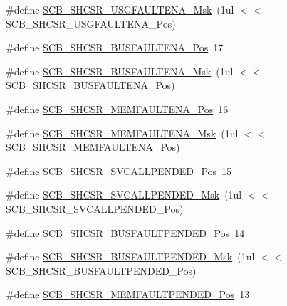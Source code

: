 \begin{DoxyCompactItemize}
\item 
\#define \hyperlink{group__CMSIS__CM3__SCB_ga056fb6be590857bbc029bed48b21dd79}{S\+C\+B\+\_\+\+S\+H\+C\+S\+R\+\_\+\+U\+S\+G\+F\+A\+U\+L\+T\+E\+N\+A\+\_\+\+Msk}~(1ul $<$$<$ S\+C\+B\+\_\+\+S\+H\+C\+S\+R\+\_\+\+U\+S\+G\+F\+A\+U\+L\+T\+E\+N\+A\+\_\+\+Pos)
\item 
\#define \hyperlink{group__CMSIS__CM3__SCB_ga3d32edbe4a5c0335f808cfc19ec7e844}{S\+C\+B\+\_\+\+S\+H\+C\+S\+R\+\_\+\+B\+U\+S\+F\+A\+U\+L\+T\+E\+N\+A\+\_\+\+Pos}~17
\item 
\#define \hyperlink{group__CMSIS__CM3__SCB_ga43e8cbe619c9980e0d1aacc85d9b9e47}{S\+C\+B\+\_\+\+S\+H\+C\+S\+R\+\_\+\+B\+U\+S\+F\+A\+U\+L\+T\+E\+N\+A\+\_\+\+Msk}~(1ul $<$$<$ S\+C\+B\+\_\+\+S\+H\+C\+S\+R\+\_\+\+B\+U\+S\+F\+A\+U\+L\+T\+E\+N\+A\+\_\+\+Pos)
\item 
\#define \hyperlink{group__CMSIS__CM3__SCB_ga685b4564a8760b4506f14ec4307b7251}{S\+C\+B\+\_\+\+S\+H\+C\+S\+R\+\_\+\+M\+E\+M\+F\+A\+U\+L\+T\+E\+N\+A\+\_\+\+Pos}~16
\item 
\#define \hyperlink{group__CMSIS__CM3__SCB_gaf084424fa1f69bea36a1c44899d83d17}{S\+C\+B\+\_\+\+S\+H\+C\+S\+R\+\_\+\+M\+E\+M\+F\+A\+U\+L\+T\+E\+N\+A\+\_\+\+Msk}~(1ul $<$$<$ S\+C\+B\+\_\+\+S\+H\+C\+S\+R\+\_\+\+M\+E\+M\+F\+A\+U\+L\+T\+E\+N\+A\+\_\+\+Pos)
\item 
\#define \hyperlink{group__CMSIS__CM3__SCB_ga2f93ec9b243f94cdd3e94b8f0bf43641}{S\+C\+B\+\_\+\+S\+H\+C\+S\+R\+\_\+\+S\+V\+C\+A\+L\+L\+P\+E\+N\+D\+E\+D\+\_\+\+Pos}~15
\item 
\#define \hyperlink{group__CMSIS__CM3__SCB_ga6095a7acfbad66f52822b1392be88652}{S\+C\+B\+\_\+\+S\+H\+C\+S\+R\+\_\+\+S\+V\+C\+A\+L\+L\+P\+E\+N\+D\+E\+D\+\_\+\+Msk}~(1ul $<$$<$ S\+C\+B\+\_\+\+S\+H\+C\+S\+R\+\_\+\+S\+V\+C\+A\+L\+L\+P\+E\+N\+D\+E\+D\+\_\+\+Pos)
\item 
\#define \hyperlink{group__CMSIS__CM3__SCB_gaa22551e24a72b65f1e817f7ab462203b}{S\+C\+B\+\_\+\+S\+H\+C\+S\+R\+\_\+\+B\+U\+S\+F\+A\+U\+L\+T\+P\+E\+N\+D\+E\+D\+\_\+\+Pos}~14
\item 
\#define \hyperlink{group__CMSIS__CM3__SCB_ga677c23749c4d348f30fb471d1223e783}{S\+C\+B\+\_\+\+S\+H\+C\+S\+R\+\_\+\+B\+U\+S\+F\+A\+U\+L\+T\+P\+E\+N\+D\+E\+D\+\_\+\+Msk}~(1ul $<$$<$ S\+C\+B\+\_\+\+S\+H\+C\+S\+R\+\_\+\+B\+U\+S\+F\+A\+U\+L\+T\+P\+E\+N\+D\+E\+D\+\_\+\+Pos)
\item 
\#define \hyperlink{group__CMSIS__CM3__SCB_gaceb60fe2d8a8cb17fcd1c1f6b5aa924f}{S\+C\+B\+\_\+\+S\+H\+C\+S\+R\+\_\+\+M\+E\+M\+F\+A\+U\+L\+T\+P\+E\+N\+D\+E\+D\+\_\+\+Pos}~13
\item 
$$
\end{DoxyCompactItemize}
